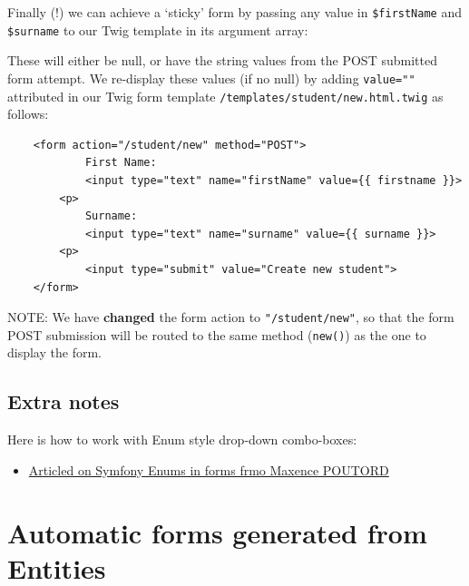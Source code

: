 \documentclass[a4paperpaper,openright]{book}
\newenvironment{Shaded}{}{}
\newcommand{\KeywordTok}[1]{\textcolor[rgb]{0.00,0.44,0.13}{\textbf{#1}}}
\newcommand{\NormalTok}[1]{#1}
\newcommand{\OtherTok}[1]{\textcolor[rgb]{0.00,0.44,0.13}{#1}}
\newcommand{\StringTok}[1]{\textcolor[rgb]{0.25,0.44,0.63}{#1}}
\providecommand{\tightlist}{%
  \setlength{\itemsep}{0pt}\setlength{\parskip}{0pt}}
\begin{document}
Finally (!) we can achieve a `sticky' form by passing any value in
\texttt{\$firstName} and \texttt{\$surname} to our Twig template in its
argument array:

\begin{Shaded}
\end{Shaded}

These will either be null, or have the string values from the POST
submitted form attempt. We re-display these values (if no null) by
adding \texttt{value=""} attributed in our Twig form template
\texttt{/templates/student/new.html.twig} as follows:

\begin{verbatim}
    <form action="/student/new" method="POST">
            First Name:
            <input type="text" name="firstName" value={{ firstname }}>
        <p>
            Surname:
            <input type="text" name="surname" value={{ surname }}>
        <p>
            <input type="submit" value="Create new student">
    </form>
\end{verbatim}

NOTE: We have \textbf{changed} the form action to
\texttt{"/student/new"}, so that the form POST submission will be routed
to the same method (\texttt{new()}) as the one to display the form.

\hypertarget{extra-notes}{%
\section{Extra notes}\label{extra-notes}}

Here is how to work with Enum style drop-down combo-boxes:

\begin{itemize}
\tightlist
\item
  \href{http://www.maxpou.fr/dealing-with-enum-symfony-doctrine/}{Articled
  on Symfony Enums in forms frmo Maxence POUTORD}
\end{itemize}

\hypertarget{automatic-forms-generated-from-entities}{%
\chapter{Automatic forms generated from
Entities}\label{automatic-forms-generated-from-entities}}
\end{document}
